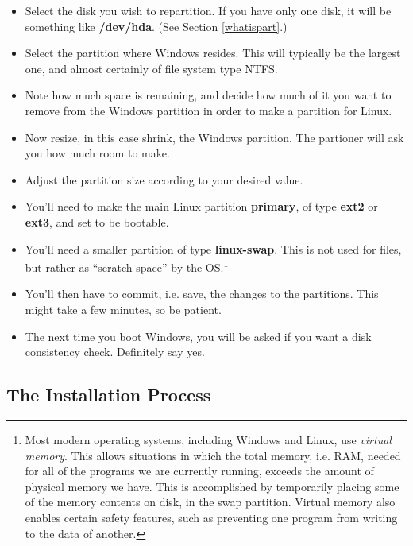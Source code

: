 \documentclass[11pt]{article}
\begin{document}
\begin{itemize}

\item Select the disk you wish to repartition.  If you have only one
disk, it will be something like {\bf /dev/hda}.  (See Section
\ref{whatispart}.)

\item Select the partition where Windows resides.  This will typically
be the largest one, and almost certainly of file system type
NTFS.

\item Note how much space is remaining, and decide how much of it you
want to remove from the Windows partition in order to make a partition
for Linux.

\item Now resize, in this case shrink, the Windows partition.  The
partioner will ask you how much room to make.

\item Adjust the partition size according to your desired value.

\item You'll need to make the main Linux partition {\bf primary}, of
type {\bf ext2} or {\bf ext3}, and set to be bootable.

\item You'll need a smaller partition of type {\bf linux-swap}.  This is
not used for files, but rather as ``scratch space'' by the
OS.\footnote{Most modern operating systems, including Windows and Linux,
use {\it virtual memory}.  This allows situations in which the total
memory, i.e. RAM, needed for all of the programs we are currently
running, exceeds the amount of physical memory we have.  This is
accomplished by temporarily placing some of the memory contents on disk,
in the swap partition.  Virtual memory also enables certain safety
features, such as preventing one program from writing to the data of
another.} 

\item You'll then have to commit, i.e. save, the changes to the
partitions.  This might take a few minutes, so be patient.

\item The next time you boot Windows, you will be asked if you want a
disk consistency check.  Definitely say yes.

\end{itemize}

\subsection{The Installation Process} 
\end{document}

